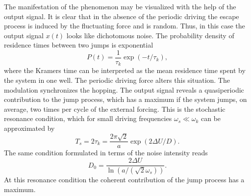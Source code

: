 The manifestation of the phenomenon may be visualized with the help of the
output signal. It is clear that in the absence of the periodic driving
the escape process is induced by the fluctuating force and is random. Thus, in
this case the output signal $x(t)$ looks like dichotomous noise. The
probability density of residence times between two jumps is exponential
\begin{equation}
  P(t) = \frac{1}{\tau_k} \exp(-t/\tau_k),
\end{equation}
where the Kramers time can be
interpreted as the mean residence time spent by the system in one well.
The periodic driving force alters this situation. The modulation synchronizes
the hopping. The output signal reveals a quasiperiodic contribution to the
jump process, which has a maximum if the system jumps, on average, two times
per cycle of the external forcing. This is the stochastic resonance condition,
which for small driving frequencies $\omega_s \ll \omega_k$ 
can be approximated by \cite{Jung}
\begin{equation}
\label{eq:ResonanceCondition}
  T_s = 2 \tau_k = \frac{2 \pi \sqrt{2}}{a} \exp(2 \Delta U / D).
\end{equation}
The same condition formulated in terms of the noise intensity reads
\begin{equation}
\label{eq:ResonanceConditionD}
  D_0 = \frac{2 \Delta U}{\ln(a/(\sqrt{2} \omega_s))}.
\end{equation}
At this resonance condition the coherent contribution of the jump process has
a maximum.

